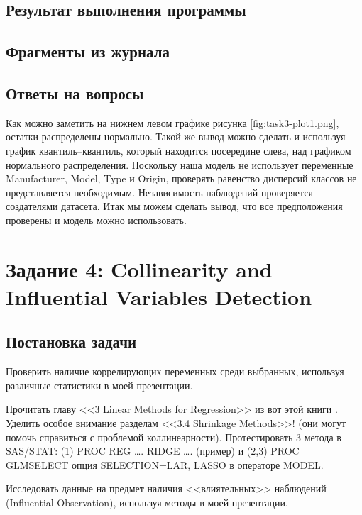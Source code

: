 \documentclass[12pt,a4paper]{article}
\begin{document}
  \subsection{Результат выполнения программы}

  \subsection{Фрагменты из журнала}

  \subsection{Ответы на вопросы}
  Как можно заметить на нижнем левом графике рисунка \ref{fig:task3-plot1.png}, остатки распределены нормально.
  Такой-же вывод можно сделать и используя график квантиль--квантиль,
  который находится посередине слева, над графиком нормального распределения.
  Поскольку наша модель не использует переменные Manufacturer, Model, Type и Origin,
  проверять равенство дисперсий классов не представляется необходимым.
  Независимость наблюдений проверяется создателями датасета.
  Итак мы можем сделать вывод, что все предположения проверены и модель можно использовать.


  \newpage
  \section{Задание 4: Collinearity and Influential Variables Detection}
  \subsection{Постановка задачи}
  Проверить наличие коррелирующих переменных среди выбранных, используя различные статистики в моей презентации.

  Прочитать главу <<3 Linear Methods for Regression>> из вот этой книги \cite{book}.
  Уделить особое внимание разделам <<3.4 Shrinkage Methods>>!
  (они могут помочь справиться с проблемой коллинеарности).
  Протестировать 3 метода в SAS/STAT: (1) PROC REG …. RIDGE ….
  (пример) и (2,3) PROC GLMSELECT опция SELECTION={LAR, LASSO} в операторе MODEL.

  Исследовать данные на предмет наличия <<влиятельных>> наблюдений (Influential Observation), используя методы в моей презентации.
\end{document}
